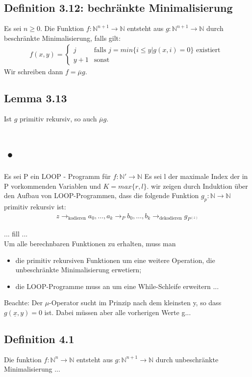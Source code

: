 \subsection{Definition 3.12: bechränkte Minimalisierung}
Es sei $n \geq 0 $. Die Funktion $ f: \mathbb{N}^{n+1} \to \mathbb{N}$ entsteht aus $g: \mathbb{N}^{n+1} \to \mathbb{N}$ durch beschränkte Minimalisierung, falls gilt:
\begin{align*}
	f(x,y) = \begin{cases} j &\text{falls } j = min\{i\leq y | g(x,i) = 0\} \text{ existiert }\\
	y+1 &\text{sonst}
	\end{cases}
\end{align*}
Wir schreiben dann $f = \overline \mu g$.
\subsection{Lemma 3.13}
Ist $g$ primitiv rekursiv, so auch $\overline \mu g$.

\section{•}
Es sei P ein LOOP - Programm für $f: \mathbb{N}' \to \mathbb{N}$
Es sei l der maximale Index der in P vorkommenden Variablen und $ K = max\{r,l\}$. wir zeigen durch Induktion über den Aufbau von LOOP-Programmen, dass die folgende Funktion $g_p : \mathbb{N}\to \mathbb{N}$ primitiv rekursiv ist:
\begin{align*}
	z \to_{\text{kodieren}} a_0, \ldots , a_k \to_P b_0, \ldots, b_k \to_{\text{dekodieren}} g_{P^{(z)}}
\end{align*}

... fill ... \\

Um alle berechnbaren Funktionen zu erhalten, muss man
\begin{itemize}
	\item die primitiv rekursiven Funktionen um eine weitere Operation, die unbeschränkte Minimalisierung erwetiern;
	\item die LOOP-Programme muss an um eine While-Schleife erweitern ...
\end{itemize}
Beachte: Der $\mu$-Operator sucht im Prinzip nach dem kleinsten y, so dass $g(\underline{x},y) = 0$ ist. Dabei müssen aber alle vorherigen Werte g...
\subsection{Definition 4.1}
Die funktion $f: \mathbb{N}^n \to \mathbb{N}$ entsteht aus $g:\mathbb{N}^{n+1} \to \mathbb{N}$ durch unbeschränkte Minimalisierung ...
